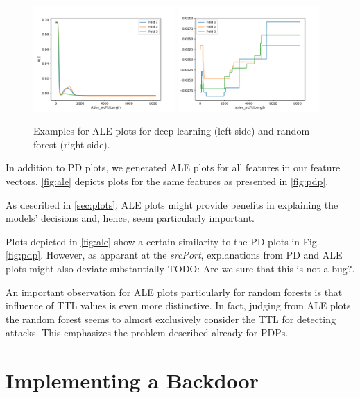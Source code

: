 \documentclass[10pt,sigconf,letterpaper,dvipsnames]{acmart}
\newcommand\note[2]{{\color{#1}#2}}
\newcommand\todo[1]{{\note{red}{TODO: #1}}}
\begin{document}
\begin{figure}[h]
\includegraphics[width=0.48\textwidth]{../ale_CAIA_backdoor_17/apply(stdev(ipTotalLength),forward)_nn.pdf}
\includegraphics[width=0.48\textwidth]{../ale_CAIA_backdoor_17/apply(stdev(ipTotalLength),forward)_rf.pdf}

\caption{Examples for ALE plots for deep learning (left side) and random forest (right side).}
\label{fig:ale}
\end{figure}

In addition to PD plots, we generated ALE plots for all features in our feature vectors. \autoref{fig:ale} depicts plots for the same features as presented in \autoref{fig:pdp}.

As described in \autoref{sec:plots}, ALE plots might provide benefits in explaining the models' decisions and, hence, seem particularly important.

Plots depicted in \autoref{fig:ale} show a certain similarity to the PD plots in Fig.\ref{fig:pdp}. However, as apparant at the \textit{srcPort}, explanations from PD and ALE plots might also deviate substantially \todo{Are we sure that this is not a bug?}.

An important observation for ALE plots particularly for random forests is that influence of TTL values is even more distinctive. In fact, judging from ALE plots the random forest seems to almost exclusively consider the TTL for detecting attacks. This emphasizes the problem described already for PDPs.

\section{Implementing a Backdoor}
\end{document}
